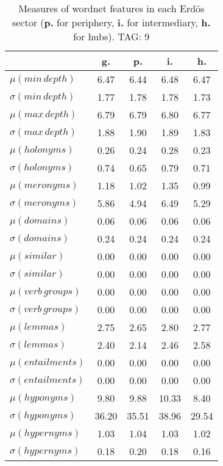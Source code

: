 \begin{table}[h!]
\begin{center}
\begin{tabular}{| l | c | c | c | c |}\hline
 & g. & p. & i. & h. \\\hline
$\mu(min\,depth)$ & 6.47  & 6.44  & 6.48  & 6.47 \\\hline
$\sigma(min\,depth)$ & 1.77  & 1.78  & 1.78  & 1.73 \\\hline
$\mu(max\,depth)$ & 6.79  & 6.79  & 6.80  & 6.77 \\\hline
$\sigma(max\,depth)$ & 1.88  & 1.90  & 1.89  & 1.83 \\\hline
$\mu(holonyms)$ & 0.26  & 0.24  & 0.28  & 0.23 \\\hline
$\sigma(holonyms)$ & 0.74  & 0.65  & 0.79  & 0.71 \\\hline
$\mu(meronyms)$ & 1.18  & 1.02  & 1.35  & 0.99 \\\hline
$\sigma(meronyms)$ & 5.86  & 4.94  & 6.49  & 5.29 \\\hline
$\mu(domains)$ & 0.06  & 0.06  & 0.06  & 0.06 \\\hline
$\sigma(domains)$ & 0.24  & 0.24  & 0.24  & 0.24 \\\hline
$\mu(similar)$ & 0.00  & 0.00  & 0.00  & 0.00 \\\hline
$\sigma(similar)$ & 0.00  & 0.00  & 0.00  & 0.00 \\\hline
$\mu(verb\,groups)$ & 0.00  & 0.00  & 0.00  & 0.00 \\\hline
$\sigma(verb\,groups)$ & 0.00  & 0.00  & 0.00  & 0.00 \\\hline
$\mu(lemmas)$ & 2.75  & 2.65  & 2.80  & 2.77 \\\hline
$\sigma(lemmas)$ & 2.40  & 2.14  & 2.46  & 2.58 \\\hline
$\mu(entailments)$ & 0.00  & 0.00  & 0.00  & 0.00 \\\hline
$\sigma(entailments)$ & 0.00  & 0.00  & 0.00  & 0.00 \\\hline
$\mu(hyponyms)$ & 9.80  & 9.88  & 10.33  & 8.40 \\\hline
$\sigma(hyponyms)$ & 36.20  & 35.51  & 38.96  & 29.54 \\\hline
$\mu(hypernyms)$ & 1.03  & 1.04  & 1.03  & 1.02 \\\hline
$\sigma(hypernyms)$ & 0.18  & 0.20  & 0.18  & 0.16 \\\hline
\end{tabular}
\caption{Measures of wordnet features in each Erd\"os sector ({{\bf p.}} for periphery, {{\bf i.}} for intermediary, {{\bf h.}} for hubs). TAG: 9}
\end{center}
\end{table}